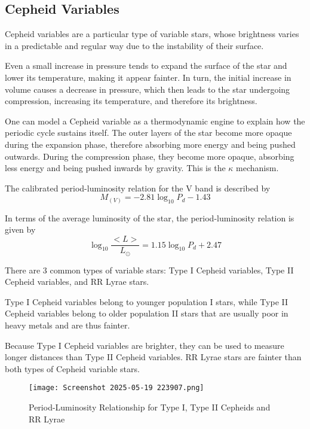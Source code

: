 \documentclass{article}
\theoremstyle{definition}
\begin{document}
\subsection{Cepheid Variables}
\begin{definition}
    Cepheid variables are a particular type of variable stars, whose brightness varies in a predictable and regular way due to the instability of their surface.
\end{definition}
\begin{note}
    Even a small increase in pressure tends to expand the surface of the star and lower its temperature, making it appear fainter. In turn, the initial increase in volume causes a decrease in pressure, which then leads to the star undergoing compression, increasing its temperature, and therefore its brightness.
\end{note}
\begin{note}
    One can model a Cepheid variable as a thermodynamic engine to explain how the periodic cycle sustains itself. The outer layers of the star become more opaque during the expansion phase, therefore absorbing more energy and being pushed outwards. During the compression phase, they become more opaque, absorbing less energy and being pushed inwards by gravity. This is the $\kappa$ mechanism.
\end{note}
\begin{theorem}
    The calibrated period-luminosity relation for the V band is described by
    $$M_{(V)}=-2.81\log_{10}P_d-1.43$$
\end{theorem}
\begin{theorem}
    In terms of the average luminosity of the star, the period-luminosity relation is given by
    $$\log_{10}\frac{\big<L\big>}{L_\odot}=1.15\log_{10}P_d+2.47$$
\end{theorem}
There are 3 common types of variable stars: Type I Cepheid variables, Type II Cepheid variables, and RR Lyrae stars. 
\begin{note}
    Type I Cepheid variables belong to younger population I stars, while Type II Cepheid variables belong to older population II stars that are usually poor in heavy metals and are thus fainter.
\end{note}
\begin{note}
    Because Type I Cepheid variables are brighter, they can be used to measure longer distances than Type II Cepheid variables. RR Lyrae stars are fainter than both types of Cepheid variable stars.
\end{note}
\begin{figure}[H]
    \centering
    \texttt{[image: Screenshot 2025-05-19 223907.png]}
    \caption{Period-Luminosity Relationship for Type I, Type II Cepheids and RR Lyrae}
\end{figure}
\end{document}
